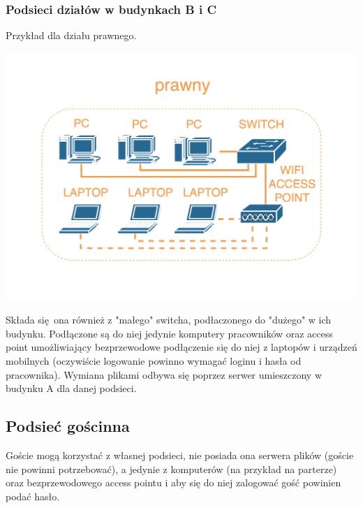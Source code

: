 \documentclass{article}
\begin{document}
      \subsubsection{Podsieci działów w budynkach B i C}
        Przykład dla działu prawnego.
        
        \centerline{\includegraphics[width=\textwidth,keepaspectratio]{podsiec-prawny-bez-serwera}}

        Składa się ona również z "małego" switcha, podłaczonego do "dużego" w ich budynku.
        Podłączone są do niej jedynie komputery pracowników oraz access point umożliwiający bezprzewodowe podłączenie się do niej z laptopów i urządzeń mobilnych (oczywiście logowanie powinno wymagać loginu i hasła od pracownika).
        Wymiana plikami odbywa się poprzez serwer umieszczony w budynku A dla danej podsieci.

    \subsection{Podsieć gościnna}
      Goście mogą korzystać z własnej podsieci, nie posiada ona serwera plików (goście nie powinni potrzebować), a jedynie z komputerów (na przykład na parterze) oraz bezprzewodowego access pointu i aby się do niej zalogować gość powinien podać hasło.
\end{document}
